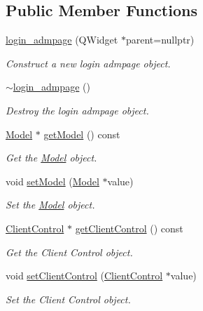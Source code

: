 \subsection*{Public Member Functions}
\begin{DoxyCompactItemize}
\item 
\hyperlink{classlogin__admpage_a36c9365b61928fc1be6387e87be814ba}{login\+\_\+admpage} (Q\+Widget $\ast$parent=nullptr)
\begin{DoxyCompactList}\small\item\em Construct a new login admpage object. \end{DoxyCompactList}\item 
\hyperlink{classlogin__admpage_a48e361ef6611dfa6e16810b53b7a9e13}{$\sim$login\+\_\+admpage} ()
\begin{DoxyCompactList}\small\item\em Destroy the login admpage object. \end{DoxyCompactList}\item 
\hyperlink{classModel}{Model} $\ast$ \hyperlink{classlogin__admpage_a6765491709543f3d887989ce9e76917d}{get\+Model} () const
\begin{DoxyCompactList}\small\item\em Get the \hyperlink{classModel}{Model} object. \end{DoxyCompactList}\item 
void \hyperlink{classlogin__admpage_a352ce22e69379a399169ce1f298a613e}{set\+Model} (\hyperlink{classModel}{Model} $\ast$value)
\begin{DoxyCompactList}\small\item\em Set the \hyperlink{classModel}{Model} object. \end{DoxyCompactList}\item 
\hyperlink{classClientControl}{Client\+Control} $\ast$ \hyperlink{classlogin__admpage_ab56e43d37e9f9944afbcb17f3740b365}{get\+Client\+Control} () const
\begin{DoxyCompactList}\small\item\em Get the Client Control object. \end{DoxyCompactList}\item 
void \hyperlink{classlogin__admpage_ae14083eb7d35e84e666b65124814a9f2}{set\+Client\+Control} (\hyperlink{classClientControl}{Client\+Control} $\ast$value)
\begin{DoxyCompactList}\small\item\em Set the Client Control object. \end{DoxyCompactList}\end{DoxyCompactItemize}
